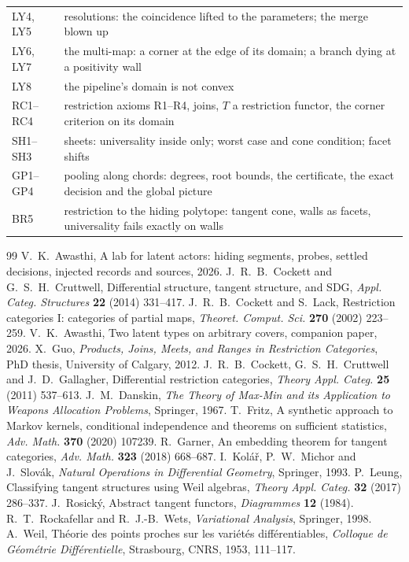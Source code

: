 \documentclass[11pt]{article}
\theoremstyle{definition}\newtheorem{definition}[theorem]{Definition}\newtheorem{remark}[theorem]{Remark}\newtheorem{example}[theorem]{Example}
\begin{document}
\begin{center}
\begin{tabular}{lp{}}
LY4, LY5 & resolutions: the coincidence lifted to the parameters; the merge blown up\\
LY6, LY7 & the multi-map: a corner at the edge of its domain; a branch dying at a positivity wall\\
LY8 & the pipeline's domain is not convex\\\midrule
RC1--RC4 & restriction axioms R1--R4, joins, $T$ a restriction functor, the corner criterion on its domain\\
SH1--SH3 & sheets: universality inside only; worst case and cone condition; facet shifts\\
GP1--GP4 & pooling along chords: degrees, root bounds, the certificate, the exact decision and the global picture\\
BR5 & restriction to the hiding polytope: tangent cone, walls as facets, universality fails exactly on walls\\\bottomrule
\end{tabular}
\end{center}

\begin{thebibliography}{99}
 V.~K.~Awasthi, A lab for latent actors: hiding segments, probes, settled decisions, injected records and sources, 2026.
 J.~R.~B.~Cockett and G.~S.~H.~Cruttwell, Differential structure, tangent structure, and SDG, \emph{Appl. Categ. Structures} \textbf{22} (2014) 331--417.
 J.~R.~B.~Cockett and S.~Lack, Restriction categories I: categories of partial maps, \emph{Theoret. Comput. Sci.} \textbf{270} (2002) 223--259.
 V.~K.~Awasthi, Two latent types on arbitrary covers, companion paper, 2026.
 X.~Guo, \emph{Products, Joins, Meets, and Ranges in Restriction Categories}, PhD thesis, University of Calgary, 2012.
 J.~R.~B.~Cockett, G.~S.~H.~Cruttwell and J.~D.~Gallagher, Differential restriction categories, \emph{Theory Appl. Categ.} \textbf{25} (2011) 537--613.
 J.~M.~Danskin, \emph{The Theory of Max-Min and its Application to Weapons Allocation Problems}, Springer, 1967.
 T.~Fritz, A synthetic approach to Markov kernels, conditional independence and theorems on sufficient statistics, \emph{Adv. Math.} \textbf{370} (2020) 107239.
 R.~Garner, An embedding theorem for tangent categories, \emph{Adv. Math.} \textbf{323} (2018) 668--687.
 I.~Kolář, P.~W.~Michor and J.~Slovák, \emph{Natural Operations in Differential Geometry}, Springer, 1993.
 P.~Leung, Classifying tangent structures using Weil algebras, \emph{Theory Appl. Categ.} \textbf{32} (2017) 286--337.
 J.~Rosický, Abstract tangent functors, \emph{Diagrammes} \textbf{12} (1984).
 R.~T.~Rockafellar and R.~J.-B.~Wets, \emph{Variational Analysis}, Springer, 1998.
 A.~Weil, Théorie des points proches sur les variétés différentiables, \emph{Colloque de Géométrie Différentielle}, Strasbourg, CNRS, 1953, 111--117.
\end{thebibliography}
\end{document}
